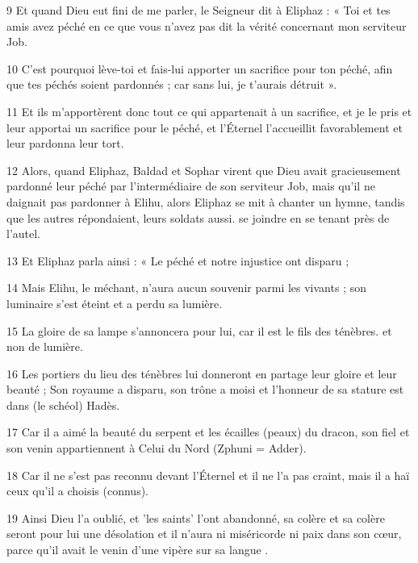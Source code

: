 \par 9 Et quand Dieu eut fini de me parler, le Seigneur dit à Eliphaz : « Toi et tes amis avez péché en ce que vous n'avez pas dit la vérité concernant mon serviteur Job.

\par 10 C'est pourquoi lève-toi et fais-lui apporter un sacrifice pour ton péché, afin que tes péchés soient pardonnés ; car sans lui, je t’aurais détruit ».

\par 11 Et ils m'apportèrent donc tout ce qui appartenait à un sacrifice, et je le pris et leur apportai un sacrifice pour le péché, et l'Éternel l'accueillit favorablement et leur pardonna leur tort.

\par 12 Alors, quand Eliphaz, Baldad et Sophar virent que Dieu avait gracieusement pardonné leur péché par l'intermédiaire de son serviteur Job, mais qu'il ne daignait pas pardonner à Elihu, alors Eliphaz se mit à chanter un hymne, tandis que les autres répondaient, leurs soldats aussi. se joindre en se tenant près de l’autel.

\par 13 Et Eliphaz parla ainsi : « Le péché et notre injustice ont disparu ;

\par 14 Mais Elihu, le méchant, n'aura aucun souvenir parmi les vivants ; son luminaire s'est éteint et a perdu sa lumière.

\par 15 La gloire de sa lampe s'annoncera pour lui, car il est le fils des ténèbres. et non de lumière.

\par 16 Les portiers du lieu des ténèbres lui donneront en partage leur gloire et leur beauté ; Son royaume a disparu, son trône a moisi et l'honneur de sa stature est dans (le schéol) Hadès.

\par 17 Car il a aimé la beauté du serpent et les écailles (peaux) du dracon, son fiel et son venin appartiennent à Celui du Nord (Zphuni = Adder).

\par 18 Car il ne s'est pas reconnu devant l'Éternel et il ne l'a pas craint, mais il a haï ceux qu'il a choisis (connus).

\par 19 Ainsi Dieu l'a oublié, et 'les saints' l'ont abandonné, sa colère et sa colère seront pour lui une désolation et il n'aura ni miséricorde ni paix dans son cœur, parce qu'il avait le venin d'une vipère sur sa langue .

